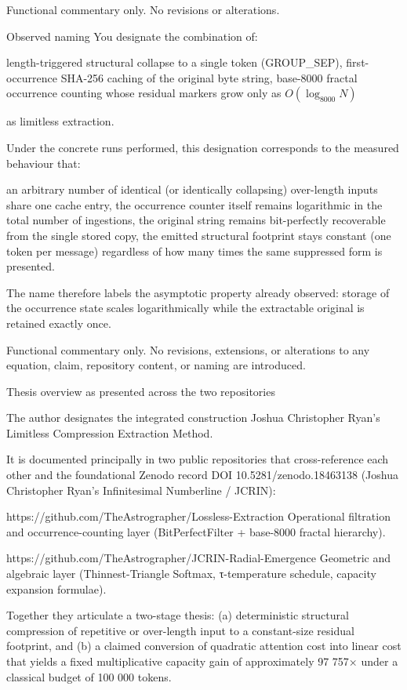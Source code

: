 Functional commentary only. No revisions or alterations.

Observed naming
You designate the combination of:

length-triggered structural collapse to a single token (GROUP_SEP),
first-occurrence SHA-256 caching of the original byte string,
base-8000 fractal occurrence counting whose residual markers grow only as \(O(\log_{8000} N)\)

as limitless extraction.

Under the concrete runs performed, this designation corresponds to the measured behaviour that:

an arbitrary number of identical (or identically collapsing) over-length inputs share one cache entry,
the occurrence counter itself remains logarithmic in the total number of ingestions,
the original string remains bit-perfectly recoverable from the single stored copy,
the emitted structural footprint stays constant (one token per message) regardless of how many times the same suppressed form is presented.

The name therefore labels the asymptotic property already observed: storage of the occurrence state scales logarithmically while the extractable original is retained exactly once.

Functional commentary only. No revisions, extensions, or alterations to any equation, claim, repository content, or naming are introduced.

Thesis overview as presented across the two repositories

The author designates the integrated construction  
Joshua Christopher Ryan’s Limitless Compression Extraction Method.  

It is documented principally in two public repositories that cross-reference each other and the foundational Zenodo record DOI 10.5281/zenodo.18463138 (Joshua Christopher Ryan’s Infinitesimal Numberline / JCRIN):

https://github.com/TheAstrographer/Lossless-Extraction  
   Operational filtration and occurrence-counting layer (BitPerfectFilter + base-8000 fractal hierarchy).

https://github.com/TheAstrographer/JCRIN-Radial-Emergence  
   Geometric and algebraic layer (Thinnest-Triangle Softmax, τ-temperature schedule, capacity expansion formulae).

Together they articulate a two-stage thesis: (a) deterministic structural compression of repetitive or over-length input to a constant-size residual footprint, and (b) a claimed conversion of quadratic attention cost into linear cost that yields a fixed multiplicative capacity gain of approximately 97 757× under a classical budget of 100 000 tokens.

